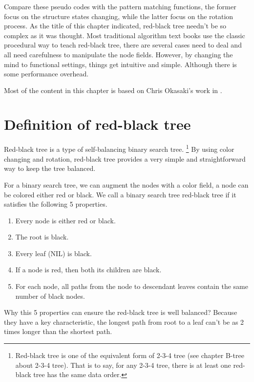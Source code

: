 \documentclass{article}
\begin{document}
Compare these pseudo codes with the pattern matching functions, 
the former focus on the structure states changing, while the 
latter focus on the rotation process. As the title of this 
chapter indicated, red-black tree needn't be so complex as it 
was thought. Most traditional algorithm text books use the 
classic procedural way to teach red-black tree, there are 
several cases need to deal and all need carefulness to 
manipulate the node fields. However, by changing
the mind to functional settings, things get intuitive and
simple. Although there is some performance overhead.

Most of the content in this chapter is based on Chris Okasaki's
work in \cite{okasaki}.

\section{Definition of red-black tree}

Red-black tree is a type of self-balancing binary search tree\cite{wiki}. 
\footnote{Red-black tree is one of the equivalent form of 2-3-4 tree (see chapter
B-tree about 2-3-4 tree). That is to say, for any 2-3-4 tree, there is at least 
one red-black tree has the same data order.} By using color changing and rotation, 
red-black tree provides a very simple and straightforward way to keep 
the tree balanced.

For a binary search tree, we can augment the nodes with a color field, a node
can be colored either red or black. We call a binary search tree red-black tree 
if it satisfies the following 5 properties\cite{CLRS}.

\begin{enumerate}
\item Every node is either red or black.
\item The root is black.
\item Every leaf (NIL) is black.
\item If a node is red, then both its children are black.
\item For each node, all paths from the node to descendant leaves contain the same number of black nodes.
\end{enumerate}

Why this 5 properties can ensure the red-black tree is well balanced? 
Because they have a key characteristic, the longest path from root to 
a leaf can't be as 2 times longer than the shortest path.
\end{document}
